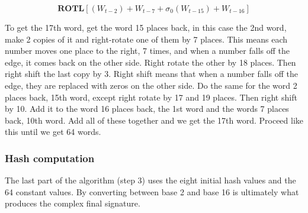         
            \[ \textbf{ROTL} [(W_{t-2}) + W_{t-7} + \sigma_0(W_{t-15}) + W_{t-16}]\]
        
        To get the 17th word, get the word 15 places back, in this case the 2nd word, make 2 copies of it and right-rotate one of them by 7 places. This means each number moves one place to the right, 7 times, and when a number falls off the edge, it comes back on the other side. Right rotate the other by 18 places. Then right shift the last copy by 3. Right shift means that when a number falls off the edge, they are replaced with zeros on the other side. Do the same for the word 2 places back, 15th word, except right rotate by 17 and 19 places. Then right shift by 10. Add it to the word 16 places back, the 1st word and the words 7 places back, 10th word. Add all of these together and we get the 17th word. Proceed like this until we get 64 words. 
        
        \subsubsection{ Hash computation}
        
        The last part of the algorithm (step 3) uses the eight initial hash values and the 64 constant values. By converting between base 2 and base 16 is ultimately what produces the complex final signature. 
            
